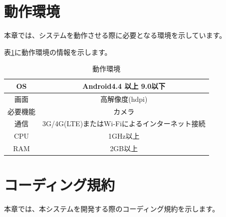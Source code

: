 \documentclass[a4j]{jarticle}
\begin{document}
\section{動作環境}
本章では、システムを動作させる際に必要となる環境を示しています。

表\ref{Operationg_Environment}に動作環境の情報を示します。

\begin{table}[H]
    \caption{動作環境}
    \label{Operationg_Environment}
    \begin{center}
        \begin{tabular}{|c||c|} \hline
            OS & Android4.4 以上 9.0以下 \\ \hline
            画面 & 高解像度(hdpi) \\ \hline
            必要機能 & カメラ \\ \hline
            通信 & 3G/4G(LTE)またはWi-Fiによるインターネット接続 \\ \hline
            CPU & 1GHz以上 \\ \hline
            RAM & 2GB以上 \\ \hline

        \end{tabular}
    \end{center}
\end{table}

\section{コーディング規約}
本章では、本システムを開発する際のコーディング規約を示します。
\end{document}
